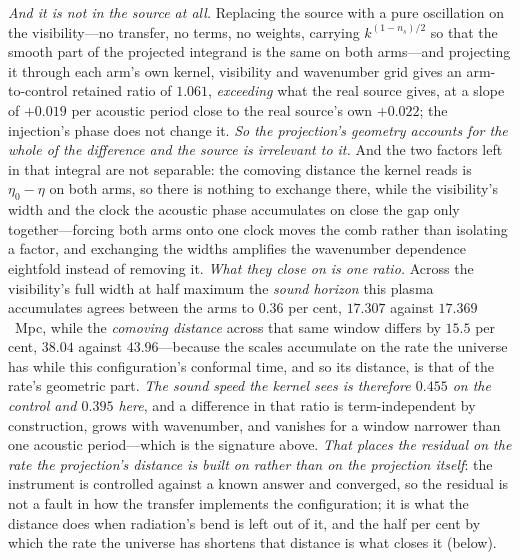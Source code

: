 \documentclass[11pt,a4paper]{article}
\theoremstyle{plain}
\theoremstyle{definition}
\theoremstyle{remark}
\begin{document}
\emph{And it is not in the source at all.} Replacing the source with a pure oscillation on the
visibility---no transfer, no terms, no weights, carrying $k^{(1-n_s)/2}$ so that the smooth part of the
projected integrand is the same on both arms---and projecting it through each arm's own kernel,
visibility and wavenumber grid gives an arm-to-control retained ratio of $1.061$, \emph{exceeding} what the real
source gives, at a slope of $+0.019$ per acoustic period close to the real source's own $+0.022$; the injection's phase does not change
it. \emph{So the projection's geometry accounts for the whole of the difference and the source is
irrelevant to it.} And the two factors left in that integral are not separable: the comoving distance
the kernel reads is $\eta_0-\eta$ on both arms, so there is nothing to exchange there, while the
visibility's width and the clock the acoustic phase accumulates on close the gap only together---forcing
both arms onto one clock moves the comb rather than isolating a factor, and exchanging the widths
amplifies the wavenumber dependence eightfold instead of removing it. \emph{What they close on is one
ratio.} Across the visibility's full width at half maximum the \emph{sound horizon} this plasma
accumulates agrees between the arms to $0.36$ per cent, $17.307$ against $17.369$~Mpc, while the
\emph{comoving distance} across that same window differs by $15.5$ per cent, $38.04$ against
$43.96$---because the scales accumulate on the rate the universe has while this configuration's conformal time,
and so its distance, is that of the rate's geometric part. \emph{The sound speed the kernel sees is therefore $0.455$ on the control and
$0.395$ here}, and a difference in that ratio is term-independent by construction, grows with
wavenumber, and vanishes for a window narrower than one acoustic period---which is the signature
above.
\emph{That places the residual on the rate the projection's distance is built on rather than on the
projection itself}: the instrument is controlled against a known answer and converged, so the residual is
not a fault in how the transfer implements the configuration; it is what the distance does when radiation's
bend is left out of it, and the half per cent by which the rate the universe has shortens that distance is
what closes it (below).
\end{document}
